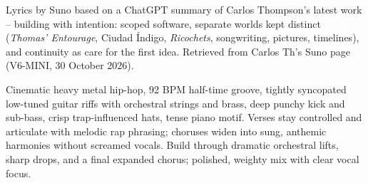 
\label{sec:build-it-with-intention}
\begin{notes}
Lyrics by Suno based on a ChatGPT summary of Carlos Thompson's latest work -- building with intention: scoped software, separate worlds kept distinct (\emph{Thomas' Entourage}, Ciudad Índigo, \emph{Ricochets}, songwriting, pictures, timelines), and continuity as care for the first idea. Retrieved from Carlos Th's Suno page (V6-MINI, 30 October 2026).
\end{notes}
\begin{style}
Cinematic heavy metal hip-hop, 92 BPM half-time groove, tightly syncopated low-tuned guitar riffs with orchestral strings and brass, deep punchy kick and sub-bass, crisp trap-influenced hats, tense piano motif. Verses stay controlled and articulate with melodic rap phrasing; choruses widen into sung, anthemic harmonies without screamed vocals. Build through dramatic orchestral lifts, sharp drops, and a final expanded chorus; polished, weighty mix with clear vocal focus.
\end{style}
